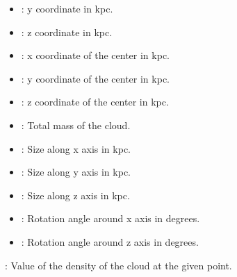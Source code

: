 \documentclass[letterpaper,10pt,english]{sphinxmanual}
\begin{document}
\begin{fulllineitems}
\begin{fulllineitems}
\begin{description}
\begin{itemize}
\item {} 
\sphinxAtStartPar
{}: y coordinate in kpc.

\item {} 
\sphinxAtStartPar
{}: z coordinate in kpc.

\item {} 
\sphinxAtStartPar
{}: x coordinate of the center in kpc.

\item {} 
\sphinxAtStartPar
{}: y coordinate of the center in kpc.

\item {} 
\sphinxAtStartPar
{}: z coordinate of the center in kpc.

\item {} 
\sphinxAtStartPar
{}: Total mass of the cloud.

\item {} 
\sphinxAtStartPar
{}: Size along x axis in kpc.

\item {} 
\sphinxAtStartPar
{}: Size along y axis in kpc.

\item {} 
\sphinxAtStartPar
{}: Size along z axis in kpc.

\item {} 
\sphinxAtStartPar
{}: Rotation angle around x axis in degrees.

\item {} 
\sphinxAtStartPar
{}: Rotation angle around z axis in degrees.

\end{itemize}

\sphinxAtStartPar
{} : Value of the density of the cloud at the given point.

\end{description}

\end{fulllineitems}



\end{fulllineitems}
\end{document}
